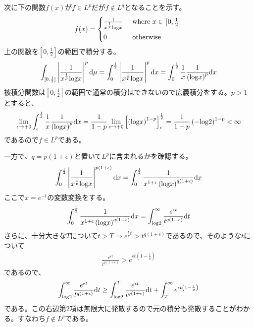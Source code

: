 \documentclass{article}
\begin{document}
次に下の関数$f(x)$が$f\in L^p$だが$f\notin L^q$となることを示す。
\begin{align*}
	f(x) = \begin{cases}
	\frac{1}{x^{\frac{1}{p}} {\rm log}x}\ &\text{where}\ x\in \left[0,\frac{1}{2} \right]\\[8pt]
	0\ &\text{otherwise}
	\end{cases}
\end{align*}
上の関数を$\left[0,\frac{1}{2} \right]$の範囲で積分する。
\begin{align*}
	\int_{[0,{\frac{1}{2}}]} \left| \frac{1}{x^{\frac{1}{p}} {\rm log}x} \right|^{p}\mathrm{d}\mu = \int_0^{\frac{1}{2}} \left| \frac{1}{x^{\frac{1}{p}} {\rm log}x} \right|^{p}\mathrm{d}x = \int_0^{\frac{1}{2}} \frac{1}{x} \frac{1}{\left( {\rm log}x \right)^p} \mathrm{d}x
\end{align*}
被積分関数は$\left[0,\frac{1}{2} \right]$の範囲で通常の積分はできないので広義積分をする。$p > 1$とすると、
\begin{align*}
	\lim_{\epsilon \to +0} \int_{\epsilon}^{\frac{1}{2}}  \frac{1}{x} \frac{1}{\left( {\rm log}x \right)^p} \mathrm{d}x = \frac{1}{1-p} \lim_{\epsilon \to +0} \left[ \left( {\rm log}x \right)^{1-p} \right]_{\epsilon}^{\frac{1}{2}} = \frac{1}{1-p} \left( -{\rm log}2 \right)^{1-p} < \infty
\end{align*}
であるので$f \in L^p$である。

一方で、$q = p(1 + \epsilon)$と置いて$L^p$に含まれるかを確認する。
\begin{align*}
	\int_0^{\frac{1}{2}} \left| \frac{1}{x^{\frac{1}{p}} {\rm log}x} \right|^{p(1 + \epsilon)}\mathrm{d}x = \int_0^{\frac{1}{2}} \frac{1}{x^{1+\epsilon} \left( {\rm log}x \right)^{q(1 + \epsilon)}} \mathrm{d}x
\end{align*}
ここで$x = e^{-t}$の変数変換をする。
\begin{align*}
	\int_0^{\frac{1}{2}} \frac{1}{x^{1+\epsilon} \left( {\rm log}x \right)^{q(1 + \epsilon)}} \mathrm{d}x = \int_{{\rm log}2}^{\infty} \frac{e^{\epsilon t}}{t^{q(1 + \epsilon)}} \mathrm{d}t
\end{align*}
さらに、十分大きな$T$について$t > T \Rightarrow e^{\frac{\epsilon}{q}t} > t^{q(1 + \epsilon)}$であるので、そのような$t$について
\begin{align*}
	\frac{e^{\epsilon t}}{t^{q(1 + \epsilon)}} > e^{\epsilon t \left(1 - \frac{1}{q}\right)}
\end{align*}
であるので、
\begin{align*}
	\int_{{\rm log}2}^{\infty} \frac{e^{\epsilon t}}{t^{q(1 + \epsilon)}} \mathrm{d}t \geq \int_{{\rm log}2}^T \frac{e^{\epsilon t}}{t^{q(1 + \epsilon)}} \mathrm{d}t + \int_T^{\infty} e^{\epsilon t \left(1 - \frac{1}{q}\right)}
\end{align*}
である。この右辺第2項は無限大に発散するので元の積分も発散することがわかる。すなわち$f\notin L^p$である。
\end{document}
